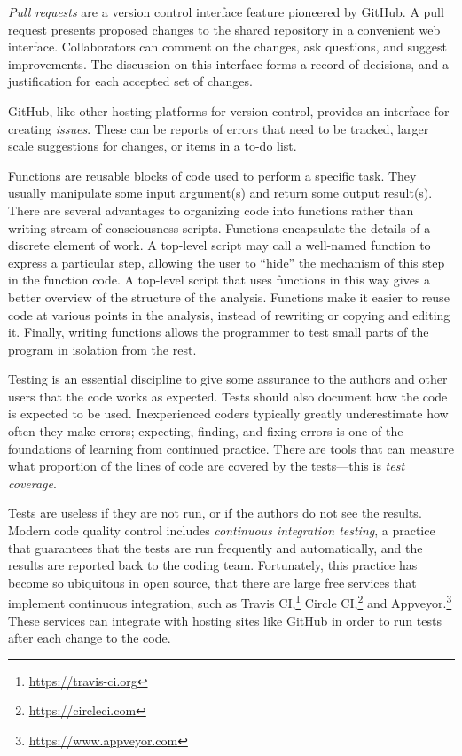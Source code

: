 \emph{Pull requests} are a version control interface feature pioneered by
GitHub.  A pull request presents proposed changes to the shared
repository in a convenient web interface. Collaborators can comment on the
changes, ask questions, and suggest improvements.  The discussion on this
interface forms a record of decisions, and a justification for each accepted
set of changes.

GitHub, like other hosting platforms for version control, provides an
interface for creating \emph{issues}.  These can be reports of errors
that need to be tracked, larger scale suggestions for
changes, or items in a to-do list.

Functions are reusable blocks of code used to perform a specific task.
They usually manipulate some input argument(s) and return some output
result(s).
There are several advantages to organizing code into functions rather
than writing stream-of-consciousness scripts.
Functions encapsulate the details of a discrete element of
work.  A top-level script may call a well-named function to express a
particular step, allowing the user to ``hide'' the mechanism of this step in
the function code.  A top-level script that uses functions in this way gives a
better overview of the structure of the analysis.
Functions make it easier to reuse code at various points in the
analysis, instead of rewriting or copying and editing it.
Finally, writing functions allows the programmer to test small parts of the
program in isolation from the rest.

Testing is an essential discipline to give some assurance to the authors and
other users that the code works as expected.
Tests should also document how the code is expected to be used.
Inexperienced coders typically greatly underestimate how often they make
errors; expecting, finding, and fixing errors is one of the foundations of
learning from continued practice.  There are tools that can measure what
proportion of the lines of code are covered by the tests---this is \emph{test
coverage}.

Tests are useless if they are not run, or if the authors do not see the
results.  Modern code quality control includes \emph{continuous integration
testing}, a practice that guarantees that the tests are run frequently and
automatically, and the results are reported back to the coding team.
Fortunately, this practice has become so ubiquitous in open source, that there
are large free services that implement continuous integration, such as Travis
CI,\footnote{\url{https://travis-ci.org}\label{travis-ci}} Circle
CI,\footnote{\url{https://circleci.com}} and
Appveyor.\footnote{\url{https://www.appveyor.com}}  These services can
integrate with hosting sites like GitHub in order to run tests after each
change to the code.

